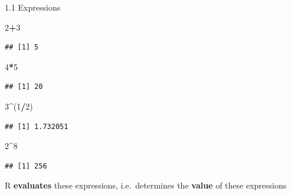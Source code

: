 \documentclass[
  ignorenonframetext,
]{beamer}
\newenvironment{Shaded}{\begin{snugshade}}{\end{snugshade}}
\newcommand{\DecValTok}[1]{\textcolor[rgb]{0.00,0.00,0.81}{#1}}
\newcommand{\NormalTok}[1]{#1}
\newcommand{\SpecialCharTok}[1]{\textcolor[rgb]{0.81,0.36,0.00}{\textbf{#1}}}
\begin{document}
\begin{frame}[fragile]{1.1 Expressions}
\protect\hypertarget{expressions}{}
\begin{Shaded}
\begin{Highlighting}[]
\DecValTok{2}\SpecialCharTok{+}\DecValTok{3}
\end{Highlighting}
\end{Shaded}

\begin{verbatim}
## [1] 5
\end{verbatim}

\begin{Shaded}
\begin{Highlighting}[]
\DecValTok{4}\SpecialCharTok{*}\DecValTok{5}
\end{Highlighting}
\end{Shaded}

\begin{verbatim}
## [1] 20
\end{verbatim}

\begin{Shaded}
\begin{Highlighting}[]
\DecValTok{3}\SpecialCharTok{\^{}}\NormalTok{(}\DecValTok{1}\SpecialCharTok{/}\DecValTok{2}\NormalTok{)}
\end{Highlighting}
\end{Shaded}

\begin{verbatim}
## [1] 1.732051
\end{verbatim}

\begin{Shaded}
\begin{Highlighting}[]
\DecValTok{2}\SpecialCharTok{\^{}}\DecValTok{8}
\end{Highlighting}
\end{Shaded}

\begin{verbatim}
## [1] 256
\end{verbatim}

R \textbf{evaluates} these expressions, i.e.~determines the
\textbf{value} of these expressions
\end{frame}
\end{document}
